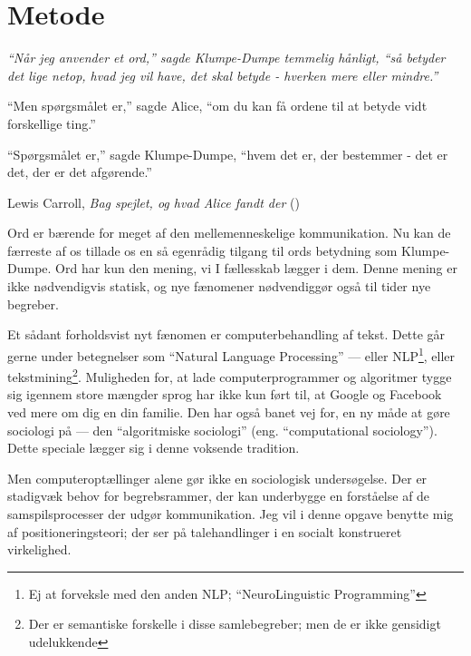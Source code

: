 \section{Metode}\label{sec:method}

\epigraph{\itshape
“Når jeg anvender et ord,” sagde Klumpe-Dumpe temmelig hånligt, “så betyder det lige netop, hvad jeg vil have, det skal betyde - hverken mere eller mindre.”

“Men spørgsmålet er,” sagde Alice, “om du kan få ordene til at betyde vidt forskellige ting.”

“Spørgsmålet er,” sagde Klumpe-Dumpe, “hvem det er, der bestemmer - det er det, der er det afgørende.”
}{Lewis Carroll, \textit{Bag spejlet, og hvad Alice fandt der} (\citeyear{carrollAliceEventyrlandOg1977})}

Ord er bærende for meget af den mellemenneskelige kommunikation.
Nu kan de færreste af os tillade os en så egenrådig tilgang til ords betydning som Klumpe-Dumpe.
Ord har kun den mening, vi I fællesskab lægger i dem.
Denne mening er ikke nødvendigvis statisk, og nye fænomener nødvendiggør også til tider nye begreber.

Et sådant forholdsvist nyt fænomen er computerbehandling af tekst.
Dette går gerne under betegnelser som “Natural Language Processing” — eller NLP\footnote{Ej at forveksle med den anden NLP; “NeuroLinguistic Programming”}, eller tekstmining\footnote{Der er semantiske forskelle i disse samlebegreber; men de er ikke gensidigt udelukkende}.
Muligheden for, at lade computerprogrammer og algoritmer tygge sig igennem store mængder sprog har ikke kun ført til, at Google og Facebook ved mere om dig en din familie.
Den har også banet vej for, en ny måde at gøre sociologi på — den “algoritmiske sociologi” (eng. “computational sociology”).
Dette speciale lægger sig i denne voksende tradition.

Men computeroptællinger alene gør ikke en sociologisk undersøgelse.
Der er stadigvæk behov for begrebsrammer, der kan underbygge en forståelse af de samspilsprocesser der udgør kommunikation.
Jeg vil i denne opgave benytte mig af positioneringsteori; der ser på talehandlinger i en socialt konstrueret virkelighed.


